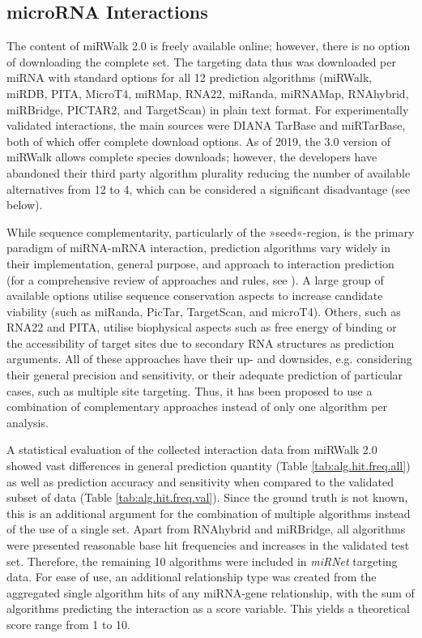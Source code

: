 \subsection{microRNA Interactions} \label{database:miRNA}
The content of miRWalk 2.0 is freely available online\cite{miRWalk2}; however, there is no option of downloading the complete set. The targeting data thus was downloaded per miRNA with standard options for all 12 prediction algorithms (miRWalk, miRDB, PITA, MicroT4, miRMap, RNA22, miRanda, miRNAMap, RNAhybrid, miRBridge, PICTAR2, and TargetScan) in plain text format. For experimentally validated interactions, the main sources were DIANA TarBase\cite{Karagkouni2018} and miRTarBase\cite{Chou2018}, both of which offer complete download options. As of 2019, the 3.0 version of miRWalk allows complete species downloads; however, the developers have abandoned their third party algorithm plurality reducing the number of available alternatives from 12 to 4, which can be considered a significant disadvantage (see below). 

While sequence complementarity, particularly of the »seed«-region, is the primary paradigm of miRNA-mRNA interaction, prediction algorithms vary widely in their implementation, general purpose, and approach to interaction prediction (for a comprehensive review of approaches and rules, see \cite{Yue2009}). A large group of available options utilise sequence conservation aspects to increase candidate viability (such as miRanda, PicTar, TargetScan, and microT4). Others, such as RNA22 and PITA, utilise biophysical aspects such as free energy of binding or the accessibility of target sites due to secondary RNA structures as prediction arguments. All of these approaches have their up- and downsides, e.g. considering their general precision and sensitivity, or their adequate prediction of particular cases, such as multiple site targeting. Thus, it has been proposed to use a combination of complementary approaches instead of only one algorithm per analysis\cite{Witkos2011}.

A statistical evaluation of the collected interaction data from miRWalk 2.0 showed vast differences in general prediction quantity (Table \ref{tab:alg.hit.freq.all}) as well as prediction accuracy and sensitivity when compared to the validated subset of data (Table \ref{tab:alg.hit.freq.val}). Since the ground truth is not known, this is an additional argument for the combination of multiple algorithms instead of the use of a single set. Apart from RNAhybrid and miRBridge, all algorithms were presented reasonable base hit frequencies and increases in the validated test set. Therefore, the remaining 10 algorithms were included in \textit{miRNet} targeting data. For ease of use, an additional relationship type was created from the aggregated single algorithm hits of any miRNA-gene relationship, with the sum of algorithms predicting the interaction as a score variable. This yields a theoretical score range from 1 to 10.

